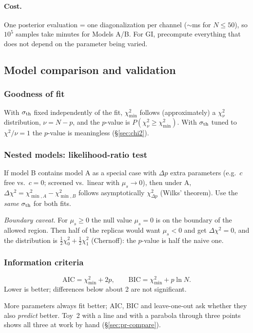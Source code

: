 \documentclass[11pt,a4paper]{article}
\numberwithin{equation}{section}
\theoremstyle{definition}
\theoremstyle{plain}
\theoremstyle{remark}
\newenvironment{plainwords}[1][In plain words]{\begin{tcolorbox}[plainbox,title={\small\bfseries #1},fonttitle=\small,coltitle=white,colbacktitle=ForestGreen!60!black]}{\end{tcolorbox}}
\numberwithin{algorithm}{section}
\newcommand{\mus}{\mu_s}
\begin{document}
\paragraph{Cost.} One posterior evaluation = one diagonalization per channel ($\sim$ms for $N\le50$), so $10^5$ samples take minutes for Models A/B. For GI, precompute everything that does not depend on the parameter being varied.

\subsection{Model comparison and validation}\label{sec:modelcomp}
\subsubsection{Goodness of fit}
With $\sigma_{\rm th}$ fixed independently of the fit, $\chi^2_{\min}$ follows (approximately) a $\chi^2_\nu$ distribution, $\nu=N-p$, and the $p$-value is $P(\chi^2_\nu\ge\chi^2_{\min})$. With $\sigma_{\rm th}$ tuned to $\chi^2/\nu=1$ the $p$-value is meaningless (\S\ref{sec:chi2}).

\subsubsection{Nested models: likelihood-ratio test}
If model B contains model A as a special case with $\Delta p$ extra parameters (e.g.\ $c$ free vs.\ $c=0$; screened vs.\ linear with $\mus\to0$), then under A, $\Delta\chi^2=\chi^2_{\min,A}-\chi^2_{\min,B}$ follows asymptotically $\chi^2_{\Delta p}$ (Wilks' theorem). Use the \emph{same} $\sigma_{\rm th}$ for both fits.

\emph{Boundary caveat.} For $\mus\ge0$ the null value $\mus=0$ is on the boundary of the allowed region. Then half of the replicas would want $\mus<0$ and get $\Delta\chi^2=0$, and the distribution is $\frac12\chi^2_0+\frac12\chi^2_1$ (Chernoff): the $p$-value is half the naive one.

\subsubsection{Information criteria}
\begin{equation}
\mathrm{AIC}=\chi^2_{\min}+2p,\qquad \mathrm{BIC}=\chi^2_{\min}+p\ln N .
\end{equation}
Lower is better; differences below about 2 are not significant.
\begin{plainwords}[In plain words]
More parameters always fit better; AIC, BIC and leave-one-out ask whether they also \emph{predict} better. Toy~2 with a line and with a parabola through three points shows all three at work by hand (\S\ref{sec:pr-compare}).
\end{plainwords}
\end{document}

